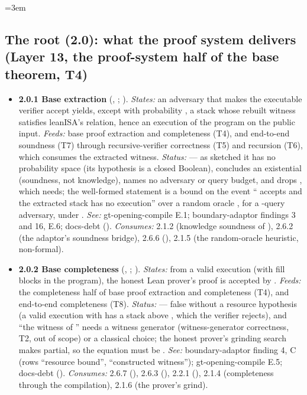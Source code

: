 \begingroup\emergencystretch=3em

\subsection[The root (2.0)]{The root (2.0): what the proof system delivers (Layer 13, the proof-system half of the base theorem, T4)}\label{sec:obl-tier-root}

\begin{itemize}[label={}, leftmargin=1.3em, itemindent=-1.3em, labelwidth=0pt, labelsep=0pt, itemsep=4pt, topsep=3pt]
\item {}\label{obl:node-2.0.1}\oblflag\textbf{2.0.1 Base extraction} (, ; ). \emph{States:} an adversary that makes the executable verifier  accept yields, except with probability , a stack whose rebuilt witness satisfies leanISA's relation, hence an execution of the program on the public input. \emph{Feeds:} base proof extraction and completeness (T4), and end-to-end soundness (T7) through recursive-verifier correctness (T5) and recursion (T6), which consumes the extracted witness. \emph{Status:}   — as sketched it has no probability space (its hypothesis is a closed Boolean), concludes an existential (soundness, not knowledge), names no adversary or query budget, and drops , which  needs; the well-formed statement is a bound on the event `` accepts and the extracted stack has no execution'' over a random oracle , for a -query adversary, under . \emph{See:} gt-opening-compile E.1; boundary-adaptor findings 3 and 16, E.6; docs-debt (). \emph{Consumes:} 2.1.2 (knowledge soundness of ), 2.6.2 (the adaptor's soundness bridge), 2.6.6 (), 2.1.5 (the random-oracle heuristic, non-formal).
\item {}\label{obl:node-2.0.2}\oblflag\textbf{2.0.2 Base completeness} (, ; ). \emph{States:} from a valid execution (with fill blocks in the program), the honest Lean prover's proof is accepted by . \emph{Feeds:} the completeness half of base proof extraction and completeness (T4), and end-to-end completeness (T8). \emph{Status:}   — false without a resource hypothesis (a valid execution with  has a stack above , which the verifier rejects), and ``the witness of '' needs a witness generator (witness-generator correctness, T2, out of scope) or a classical choice; the honest prover's grinding search makes  partial, so the equation must be . \emph{See:} boundary-adaptor finding 4, C (rows ``resource bound'', ``constructed witness''); gt-opening-compile E.5; docs-debt (). \emph{Consumes:} 2.6.7 (), 2.6.3 (), 2.2.1 (), 2.1.4 (completeness through the compilation), 2.1.6 (the prover's grind).

\end{itemize}
